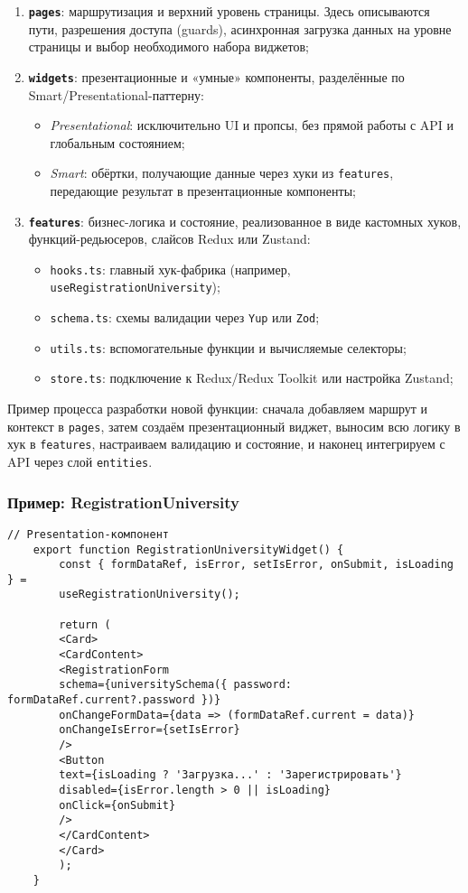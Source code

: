 \begin{enumerate}
	\item \textbf{\texttt{pages}}: маршрутизация и верхний уровень страницы. Здесь описываются пути, разрешения доступа (guards), асинхронная загрузка данных на уровне страницы и выбор необходимого набора виджетов;
	\item \textbf{\texttt{widgets}}: презентационные и «умные» компоненты, разделённые по Smart/Presentational-паттерну:
	\begin{itemize}
		\item \emph{Presentational}: исключительно UI и пропсы, без прямой работы с API и глобальным состоянием;
		\item \emph{Smart}: обёртки, получающие данные через хуки из \texttt{features}, передающие результат в презентационные компоненты;
	\end{itemize}
	\item \textbf{\texttt{features}}: бизнес-логика и состояние, реализованное в виде кастомных хуков, функций-редьюсеров, слайсов Redux или Zustand:
	\begin{itemize}
		\item \texttt{hooks.ts}: главный хук-фабрика (например, \texttt{useRegistrationUniversity});
		\item \texttt{schema.ts}: схемы валидации через \texttt{Yup} или \texttt{Zod};
		\item \texttt{utils.ts}: вспомогательные функции и вычисляемые селекторы;
		\item \texttt{store.ts}: подключение к Redux/Redux Toolkit или настройка Zustand;
	\end{itemize}
\end{enumerate}

Пример процесса разработки новой функции: сначала добавляем маршрут и контекст в \texttt{pages}, затем создаём презентационный виджет, выносим всю логику в хук в \texttt{features}, настраиваем валидацию и состояние, и наконец интегрируем с API через слой \texttt{entities}.

\subsubsection{Пример: RegistrationUniversity}

\begin{lstlisting}[breaklines=true,caption=RegistrationUniversityWidget]
	// Presentation-компонент
	export function RegistrationUniversityWidget() {
		const { formDataRef, isError, setIsError, onSubmit, isLoading } =
		useRegistrationUniversity();
		
		return (
		<Card>
		<CardContent>
		<RegistrationForm
		schema={universitySchema({ password: formDataRef.current?.password })}
		onChangeFormData={data => (formDataRef.current = data)}
		onChangeIsError={setIsError}
		/>
		<Button
		text={isLoading ? 'Загрузка...' : 'Зарегистрировать'}
		disabled={isError.length > 0 || isLoading}
		onClick={onSubmit}
		/>
		</CardContent>
		</Card>
		);
	}
\end{lstlisting}

